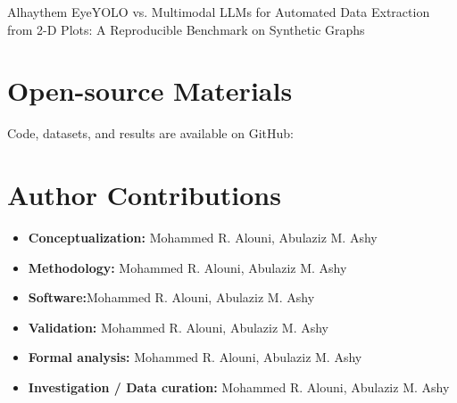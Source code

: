 \begin{teamsubmission}{Alhaythem Eye}{YOLO vs. Multimodal LLMs for Automated Data Extraction from 2-D Plots: A Reproducible Benchmark on Synthetic Graphs}
\section*{Open-source Materials}
Code, datasets, and results are available on GitHub: 


\section*{Author Contributions}
\begin{itemize}
    \item \textbf{Conceptualization:} Mohammed R. Alouni, Abulaziz M. Ashy
    \item \textbf{Methodology:} Mohammed R. Alouni, Abulaziz M. Ashy
    \item \textbf{Software:}Mohammed R. Alouni, Abulaziz M. Ashy
    \item \textbf{Validation:} Mohammed R. Alouni, Abulaziz M. Ashy
    \item \textbf{Formal analysis:} Mohammed R. Alouni, Abulaziz M. Ashy
    \item \textbf{Investigation / Data curation:} Mohammed R. Alouni, Abulaziz M. Ashy
\end{itemize}
\end{teamsubmission}




